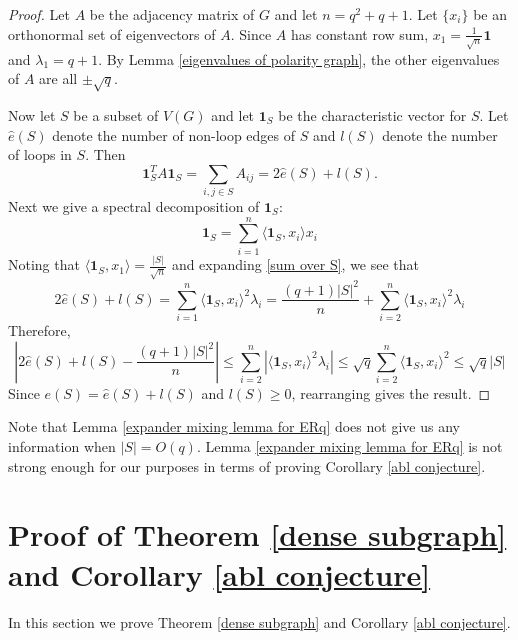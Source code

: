 \documentclass[12pt]{article}
\begin{document}
\begin{proof}
    Let $A$ be the adjacency matrix of $G$ and let $n=q^2+q+1$. Let $\{x_i\}$ be an orthonormal set of eigenvectors of $A$. Since $A$ has constant row sum, $x_1 = \frac{1}{\sqrt{n}} \mathbf{1}$ and $\lambda_1 = q+1$. By Lemma \ref{eigenvalues of polarity graph}, the other eigenvalues of $A$ are all $\pm \sqrt{q}$.
    \medskip

    Now let $S$ be a subset of $V(G)$ and let $\mathbf{1}_S$ be the characteristic vector for $S$. Let $\hat{e}(S)$ denote the number of non-loop edges of $S$ and $l(S)$ denote the number of loops in $S$. Then
    \begin{equation}\label{sum over S}
        \mathbf{1}_S^T A \mathbf{1}_S = \sum_{i,j\in S} A_{ij} = 2\hat{e}(S) + l(S).
    \end{equation}
    Next we give a spectral decomposition of $\mathbf{1}_S$:
    $$\mathbf{1}_S = \sum_{i=1}^n \langle \mathbf{1}_S,x_i\rangle x_i $$
    Noting that $\langle \mathbf{1}_S, x_1\rangle = \frac{|S|}{\sqrt{n}}$ and expanding \eqref{sum over S}, we see that
    $$ 2\hat{e}(S) + l(S) = \sum_{i=1}^n \langle \mathbf{1}_S, x_i\rangle^2 \lambda_i = \frac{(q+1)|S|^2}{n} + \sum_{i=2}^n \langle \mathbf{1}_S, x_i\rangle^2 \lambda_i $$
    Therefore,
    $$ \left|2 \hat{e}(S) + l(S) - \frac{(q+1)|S|^2}{n} \right| \leq \sum_{i=2}^n \left|\langle \mathbf{1}_S, x_i\rangle^2 \lambda_i \right| \leq \sqrt{q} \sum_{i=2}^n \langle \mathbf{1}_S, x_i\rangle^2 \leq \sqrt{q} |S| $$
    Since $e(S) = \hat{e}(S) + l(S)$ and $l(S)\geq 0$, rearranging gives the result.
\end{proof}

Note that Lemma \ref{expander mixing lemma for ERq} does not give us any information when $|S| = O( q)$.  Lemma \ref{expander mixing lemma for ERq} is not strong enough for our purposes in terms of proving Corollary \ref{abl conjecture}.

\section{Proof of Theorem \ref{dense subgraph} and Corollary \ref{abl conjecture}}\label{proofs}

In this section we prove Theorem \ref{dense subgraph} and Corollary \ref{abl conjecture}.
\end{document}

